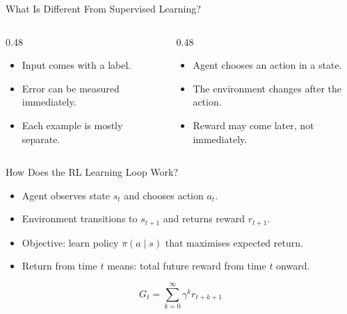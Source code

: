 \documentclass[aspectratio=169]{beamer}
\newcommand{\defaultdeckrefs}{AIMA4e Ch.22 pp.789--822; Poole3e Ch.13 pp.583--608}
\newcommand{\currentsliderefs}{\defaultdeckrefs}
\newcommand{\setslideref}[1]{\gdef\currentsliderefs{#1}}
\begin{document}
\setslideref{AIMA4e Ch.22 pp.789--822; Poole3e Ch.13 pp.583--608}
\begin{frame}{What Is Different From Supervised Learning?}
\begin{columns}[T,onlytextwidth]
  \begin{column}{0.48\textwidth}
    \begin{tcolorbox}[colback=questionbg,colframe=questionframe,boxrule=0.7pt,title=Supervised Learning]
    \begin{itemize}
      \item Input comes with a label.
      \item Error can be measured immediately.
      \item Each example is mostly separate.
    \end{itemize}
    \end{tcolorbox}
  \end{column}
  \begin{column}{0.48\textwidth}
    \begin{tcolorbox}[colback=plainbg,colframe=plainframe,boxrule=0.7pt,title=Reinforcement Learning]
    \begin{itemize}
      \item Agent chooses an action in a state.
      \item The environment changes after the action.
      \item Reward may come later, not immediately.
    \end{itemize}
    \end{tcolorbox}
  \end{column}
\end{columns}
\end{frame}

\setslideref{AIMA4e Ch.22 pp.789--822; Poole3e Ch.13 pp.583--608}
\begin{frame}{How Does the RL Learning Loop Work?}
\begin{itemize}
  \item Agent observes state $s_t$ and chooses action $a_t$.
  \item Environment transitions to $s_{t+1}$ and returns reward $r_{t+1}$.
  \item Objective: learn policy $\pi(a\mid s)$ that maximises expected return.
  \item Return from time $t$ means: total future reward from time $t$ onward.
\end{itemize}
\[
G_t = \sum_{k=0}^{\infty} \gamma^k r_{t+k+1}
\]
\end{frame}
\end{document}
